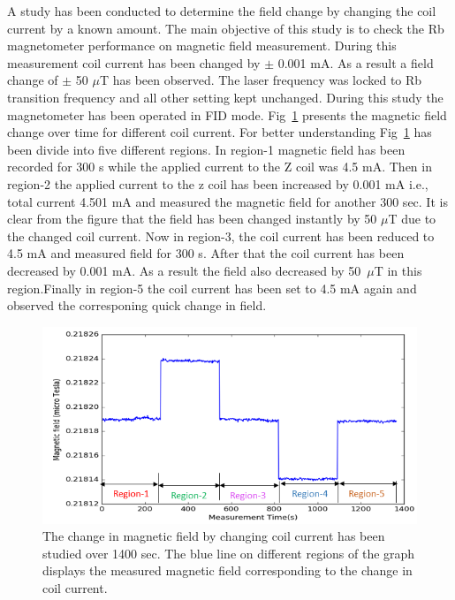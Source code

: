 \begin{itemize}
 A study has been conducted to determine the field change by changing the coil current by a known amount. The main objective of this study is to check the Rb magnetometer performance on magnetic field measurement. During this measurement coil current has been changed by $\pm$ 0.001 mA. As a result a field change of $\pm$ 50  $\mu$T  has been observed. The laser frequency was locked to Rb transition frequency and all other setting kept unchanged. During this study the magnetometer has been operated in FID mode. Fig~\ref{fig:field change} presents the magnetic field change over time for different coil current. For better understanding Fig~\ref{fig:field change} has been divide into five different regions. In region-1 magnetic field  has been recorded for 300 s while the applied current to the Z coil was 4.5 mA. Then in region-2 the applied current to the z coil has been increased by 0.001 mA i.e., total current 4.501 mA and measured the magnetic field for another 300 sec. It is clear from the figure that the field has been changed instantly by 50 $\mu$T due to the changed coil current. Now in region-3, the coil current has been reduced to 4.5 mA and measured field for 300 s. After that the coil current has been decreased by 0.001 mA. As a result the field also decreased by 50~$\mu$T in this region.Finally in region-5 the coil current has been set to 4.5 mA again and observed the corresponing quick change in field.

   \begin{figure}[h]
\centering\includegraphics[width=0.7\linewidth]{figures/field_change_with_current}
  
\caption{The change in magnetic field  by changing coil current has been studied over 1400 sec. The blue line on different regions of the graph displays the measured magnetic field corresponding to the change in coil current. \label{fig:field change}}
\end{figure}
   \end{itemize}
